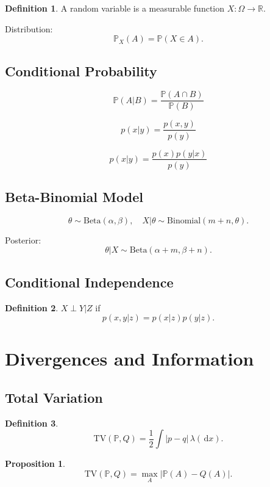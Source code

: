 \documentclass[12pt,oneside]{book}
\numberwithin{equation}{section}
\theoremstyle{definition}
\newtheorem{definition}{Definition}[section]
\theoremstyle{plain}
\newtheorem{proposition}{Proposition}[section]
\theoremstyle{remark}
\newcommand{\R}{\mathbb{R}}
\newcommand{\Prob}{\mathbb{P}}
\newcommand{\dd}{\,\mathrm{d}}
\newcommand{\Bin}{\mathrm{Binomial}}
\newcommand{\BetaDist}{\mathrm{Beta}}
\begin{document}
\begin{definition}
A random variable is a measurable function $X:\Omega \to \R$.
\end{definition}

Distribution:
\[
\Prob_X(A) = \Prob(X \in A).
\]


\subsection{Conditional Probability}

\[
\Prob(A | B) = \frac{\Prob(A \cap B)}{\Prob(B)}
\]

\[
p(x|y) = \frac{p(x,y)}{p(y)}
\]

\[
p(x|y) = \frac{p(x)p(y|x)}{p(y)}
\]


\subsection{Beta-Binomial Model}

\[
\theta \sim \BetaDist(\alpha,\beta), \quad X|\theta \sim \Bin(m+n,\theta).
\]

Posterior:
\[
\theta | X \sim \BetaDist(\alpha+m,\beta+n).
\]


\subsection{Conditional Independence}

\begin{definition}
$X \perp Y | Z$ if
\[
p(x,y|z) = p(x|z)p(y|z).
\]
\end{definition}


\section{Divergences and Information}

\subsection{Total Variation}

\begin{definition}
\[
\mathrm{TV}(\Prob,Q) = \frac{1}{2}\int |p-q|\,\lambda(\dd x).
\]
\end{definition}

\begin{proposition}
\[
\mathrm{TV}(\Prob,Q) = \max_{A} |\Prob(A)-Q(A)|.
\]
\end{proposition}
\end{document}
